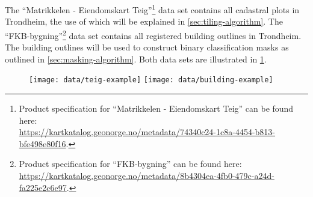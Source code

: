 The \enquote{Matrikkelen - Eiendomskart Teig}\footnote{Product specification for \enquote{Matrikkelen - Eiendomskart Teig} can be found here:\\\url{https://kartkatalog.geonorge.no/metadata/74340c24-1c8a-4454-b813-bfe498e80f16}.} data set contains all cadastral plots in Trondheim, the use of which will be explained in \cref{sec:tiling-algorithm}.
The \enquote{FKB-bygning}\footnote{Product specification for \enquote{FKB-bygning} can be found here:\\\url{https://kartkatalog.geonorge.no/metadata/8b4304ea-4fb0-479c-a24d-fa225e2c6e97}.} data set contains all registered building outlines in Trondheim.
The building outlines will be used to construct binary classification masks as outlined in \cref{sec:masking-algorithm}.
Both data sets are illustrated in \cref{fig:vector-data-example}.

\begin{figure}[htb]
  \texttt{[image: data/teig-example]}
  \texttt{[image: data/building-example]}
  \label{fig:vector-data-example}
\end{figure}
